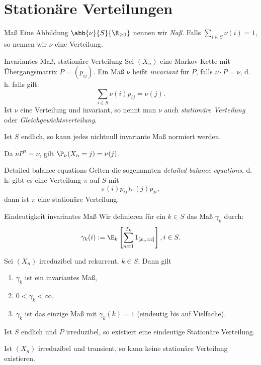 \section{Stationäre Verteilungen}

\begin{karte}{Maß}
    Eine Abbildung \( \abb{\nu}{S}{\R_{\geq 0}} \) nennen wir \textit{Naß}.
    Falls \( \sum_{i\in S} \nu(i) = 1 \), so nennen wir \(\nu\) eine Verteilung.
\end{karte}

\begin{karte}{Invariantes Maß, stationäre Verteilung}
    Sei \((X_n)\) eine Markov-Kette mit Übergangsmatrix \(P = (p_{ij})\). 
    Ein Maß \(\nu\) heißt \textit{invariant} für \(P\), falls 
    \(\nu \cdot P = \nu\), d. h. falls gilt: 
    \[ \sum_{i\in S} \nu(i) p_{ij} = \nu(j). \]
    Ist \(\nu\) eine Verteilung und invariant, so nennt man \(\nu\) 
    auch \textit{stationäre Verteilung} oder 
    \textit{Gleichgewichtsverteilung}.

    Ist \(S\) endlich, so kann jedes nichtnull invariante Maß normiert werden.

    Da \(\nu P^n = \nu\), gilt \(\P_\nu(X_n = j) = \nu(j)\).
\end{karte}

\begin{karte}{Detailed balance equations}
    Gelten die sogenannten \textit{detailed balance equations}, 
    d. h. gibt es eine Verteilung \(\pi\) auf \(S\) mit 
    \[ \pi(i) p_{ij} ) \pi(j) p_{ji}, \]
    dann ist \(\pi\) eine stationäre Verteilung.
\end{karte}

\begin{karte}{Eindeutigkeit invariantes Maß}
    Wir definieren für ein \(k\in S\) das Maß \(\gamma_k\) durch:
    \[ \gamma_k(i) := \E_k \left[ \sum_{n=1}^{T_k} 1_{[x_n = i]} \right], i \in S. \] 

    Sei \((X_n)\) irreduzibel und rekurrent, \(k\in S\). Dann gilt 
    \begin{enumerate}
        \item \(\gamma_k\) ist ein invariantes Maß,
        \item \(0 < \gamma_k < \infty\),
        \item \(\gamma_k\) ist das einzige Maß mit \(\gamma_k(k) = 1\) (eindeutig bis auf Vielfache).
    \end{enumerate}
    Ist \(S\) endlich und \(P\) irreduzibel, so existiert eine eindeutige Stationäre Verteilung.

    Ist \((X_n)\) irreduzibel und transient, so kann keine stationäre Verteilung existieren.
\end{karte}

